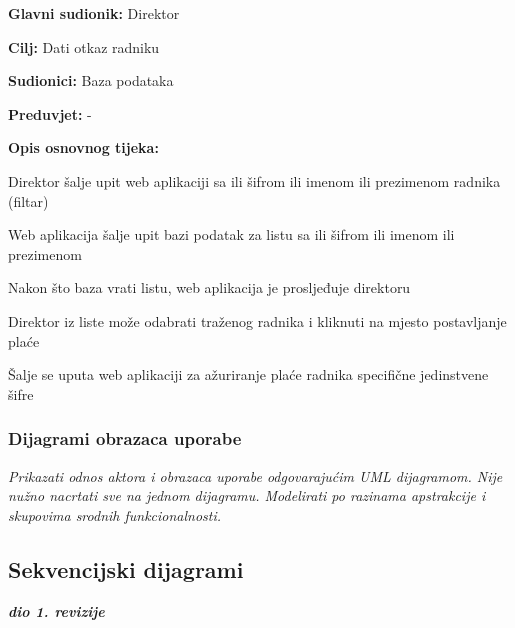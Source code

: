 				\noindent {}				
				\begin{packed_item}
					
					\item \textbf{Glavni sudionik:} Direktor
					\item  \textbf{Cilj:} Dati otkaz radniku
					\item  \textbf{Sudionici:} Baza podataka
					\item  \textbf{Preduvjet:} -
					\item  \textbf{Opis osnovnog tijeka:}
					
					\item[] \begin{packed_enum}
						
						\item Direktor šalje upit web aplikaciji sa ili šifrom ili imenom ili prezimenom radnika (filtar)
						\item Web aplikacija šalje upit bazi podatak za listu sa ili šifrom ili imenom ili prezimenom 
						\item Nakon što baza vrati listu, web aplikacija je prosljeđuje direktoru
						\item Direktor iz liste može odabrati traženog radnika i kliknuti na mjesto postavljanje plaće
						\item Šalje se uputa web aplikaciji za ažuriranje plaće radnika specifične jedinstvene šifre
						
					\end{packed_enum}
					
				\end{packed_item}
				
				\subsubsection{Dijagrami obrazaca uporabe}
					
					\textit{Prikazati odnos aktora i obrazaca uporabe odgovarajućim UML dijagramom. Nije nužno nacrtati sve na jednom dijagramu. Modelirati po razinama apstrakcije i skupovima srodnih funkcionalnosti.}
				\eject		
				
			\subsection{Sekvencijski dijagrami}
				
				\textbf{\textit{dio 1. revizije}}\\
				
